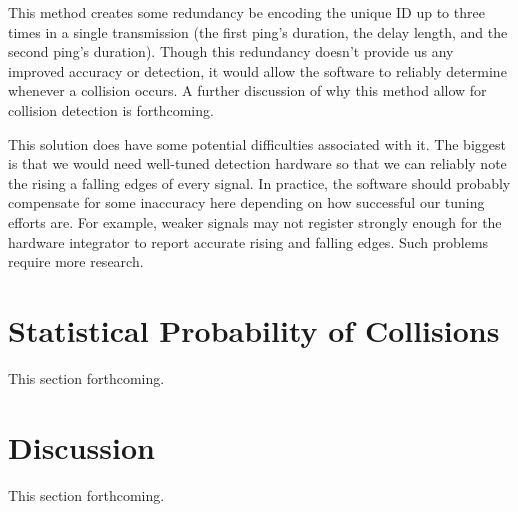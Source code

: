 \documentclass[12pt]{article}
\begin{document}
This method creates some redundancy be encoding the unique ID up to three times
in a single transmission
(the first ping's duration, the delay length, and the second ping's duration).
Though this redundancy doesn't provide us any improved accuracy or detection,
it would allow the software to reliably determine whenever a collision occurs.
A further discussion of why this method allow for collision detection is
forthcoming.


This solution does have some potential difficulties associated with it.
The biggest is that we would need well-tuned detection hardware so that we can
reliably note the rising a falling edges of every signal.
In practice, the software should probably compensate for some inaccuracy here
depending on how successful our tuning efforts are.
For example, weaker signals may not register strongly enough for the hardware
integrator to report accurate rising and falling edges.
Such problems require more research.


\section{Statistical Probability of Collisions}

This section forthcoming.

\section{Discussion}

This section forthcoming.
\end{document}
